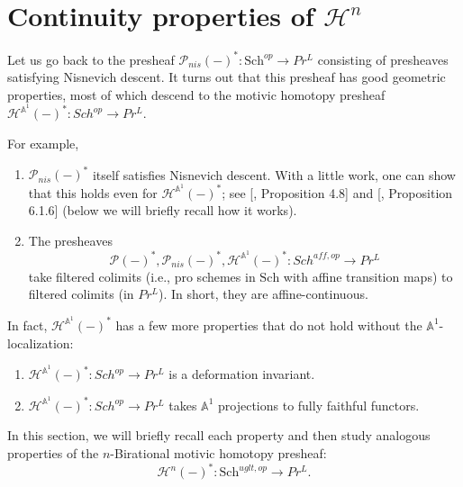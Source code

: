 \section{Continuity properties of \texorpdfstring{$\mathcal{H}^{n}$}{hb}}

Let us go back to the presheaf $\mathcal{P}_{nis}(-)^*: \mathrm{Sch}^{op}\to Pr^L$ consisting of presheaves satisfying Nisnevich descent. It turns out that this presheaf has good geometric properties, most of which descend to the motivic homotopy presheaf $\mathcal{H}^{\mathbb{A}^1}(-)^*:Sch^{op}\to Pr^L$. 

For example,

\begin{enumerate}
    \item $\mathcal{P}_{nis}(-)^{*}$ itself satisfies Nisnevich descent. With a little work, one can show that this holds even for $\mathcal{H}^{\mathbb{A}^1}(-)^*$; see [\cite{hoyois2017six}, Proposition 4.8] and [\cite{khan2016motivic}, Proposition 6.1.6] (below we will briefly recall how it works). 
    \item The presheaves $$\mathcal{P}(-)^*, \mathcal{P}_{nis}(-)^*, \mathcal{H}^{\mathbb{A}^1}(-)^*:Sch^{aff,op}\to Pr^L$$ take filtered colimits (i.e., pro schemes in $\mathrm{Sch}$ with affine transition maps) to filtered colimits (in $Pr^L$). In short, they are affine-continuous.
\end{enumerate}
    In fact, $\mathcal{H}^{\mathbb{A}^1}(-)^*$ has a few more properties that do not hold without the $\mathbb{A}^1$-localization:
\begin{enumerate}[resume]    
    \item $\mathcal{H}^{\mathbb{A}^1}(-)^*:Sch^{op}\to Pr^L$ is a deformation invariant.
    \item $ \mathcal{H}^{\mathbb{A}^1}(-)^*:Sch^{op}\to Pr^L$  takes $\mathbb{A}^1$ projections to fully faithful functors.
\end{enumerate}


In this section, we will briefly recall each property and then study analogous properties of the $n$-Birational motivic homotopy presheaf: $$\mathcal{H}^n(-)^{*}:\mathrm{Sch}^{uglt,op}\to Pr^L.$$
